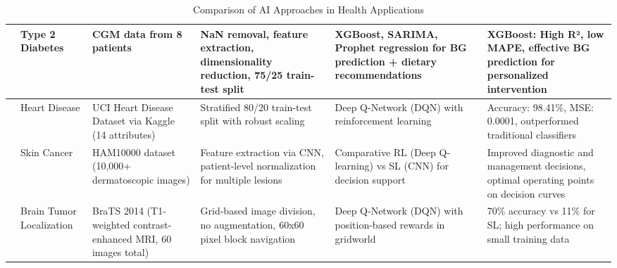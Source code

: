 \begin{table}[htbp]
\begin{adjustwidth}{-2cm}{-2cm}
\begin{tabular}{|p{1.5cm}|p{2.5cm}|p{3cm}|p{3.5cm}|p{2.5cm}|p{2.5cm}|}
\hline
\cite{article_9} & Type 2 Diabetes & CGM data from 8 patients & NaN removal, feature extraction, dimensionality reduction, 75/25 train-test split & XGBoost, SARIMA, Prophet regression for BG prediction + dietary recommendations & XGBoost: High R², low MAPE, effective BG prediction for personalized intervention \\
\hline
\cite{article_10} & Heart Disease & UCI Heart Disease Dataset via Kaggle (14 attributes) & Stratified 80/20 train-test split with robust scaling & Deep Q-Network (DQN) with reinforcement learning & Accuracy: 98.41\%, MSE: 0.0001, outperformed traditional classifiers \\
\hline
\cite{article_11} & Skin Cancer & HAM10000 dataset (10,000+ dermatoscopic images) & Feature extraction via CNN, patient-level normalization for multiple lesions & Comparative RL (Deep Q-learning) vs SL (CNN) for decision support & Improved diagnostic and management decisions, optimal operating points on decision curves \\
\hline
\cite{article_12} & Brain Tumor Localization & BraTS 2014 (T1-weighted contrast-enhanced MRI, 60 images total) & Grid-based image division, no augmentation, 60x60 pixel block navigation & Deep Q-Network (DQN) with position-based rewards in gridworld & 70\% accuracy vs 11\% for SL; high performance on small training data \\
\hline
\end{tabular}
\caption{Comparison of AI Approaches in Health Applications}
\label{tab:ai_health_comparison}
\end{adjustwidth}
\end{table}


 




